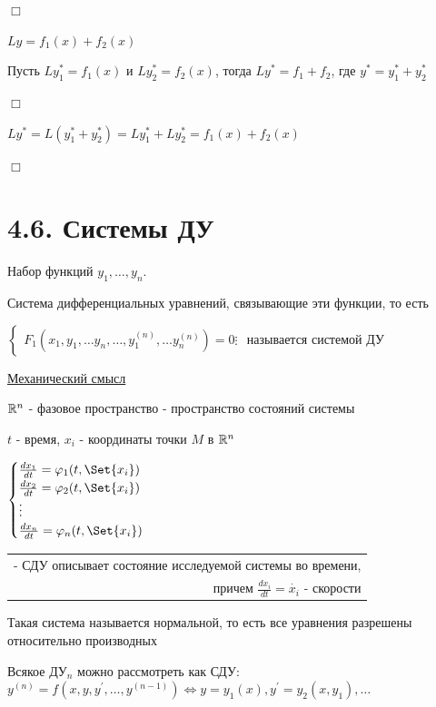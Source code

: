 \documentclass[12pt]{article}
\begin{document}
    $\Box$

    \Th $Ly = f_1(x) + f_2(x)$

    Пусть $Ly_1^* = f_1(x)$ и $Ly^*_2 = f_2(x)$, тогда $Ly^* = f_1 + f_2$, где $y^* = y_1^* + y_2^*$

    $\Box$

    $Ly^* = L(y^*_1 + y^*_2) = Ly^*_1 + Ly^*_2 = f_1(x) + f_2(x)$

    $\Box$

    \section{4.6. Системы ДУ}

    \Def Набор функций $y_1, \dots, y_n$.

    Система дифференциальных уравнений, связывающие эти функции, то есть

    $\begin{cases}
         F_1(x_1, y_1, \dots y_n, \dots, y_1^{(n)}, \dots y_n^{(n)}) = 0
         \vdots
    \end{cases}$ называется системой ДУ

    \vspace{5mm}

    \underline{Механический смысл}

    $\mathbb{R}^n$ - фазовое пространство - пространство состояний системы

    $t$ - время, $x_i$ - координаты точки $M$ в $\mathbb{R}^n$

    $\begin{cases}
         \frac{dx_1}{dt} = \varphi_1(t, \Set{x_i}) \\
         \frac{dx_2}{dt} = \varphi_2(t, \Set{x_i}) \\
         \vdots \\
         \frac{dx_n}{dt} = \varphi_n(t, \Set{x_i}) \\
    \end{cases}$ \begin{tabular}{r} - СДУ описывает состояние исследуемой системы во времени, \\ причем $\frac{dx_i}{dt} = \dot{x_i}$ - скорости \end{tabular}

    \Nota Такая система называется нормальной, то есть все уравнения разрешены относительно производных

    \Nota Всякое ДУ$_n$ можно рассмотреть как СДУ: $y^{(n)} = f(x, y, y^\prime, \dots, y^{(n - 1)}) \Longleftrightarrow y = y_1(x), y^\prime = y_2(x, y_1), \dots$
\end{document}
